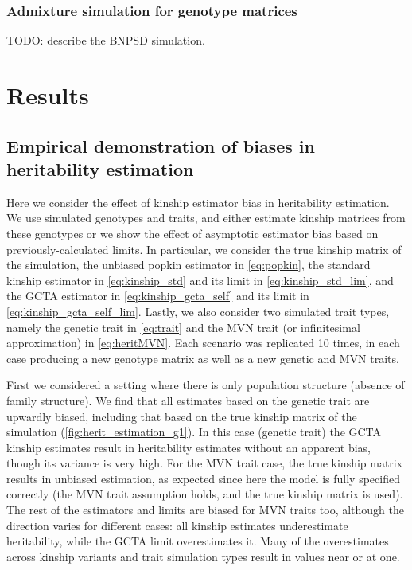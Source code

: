 \documentclass[11pt]{article}
\begin{document}
\subsubsection{Admixture simulation for genotype matrices}

TODO: describe the BNPSD simulation.

\section{Results}

\subsection{Empirical demonstration of biases in heritability estimation}

Here we consider the effect of kinship estimator bias in heritability estimation.
We use simulated genotypes and traits, and either estimate kinship matrices from these genotypes or we show the effect of asymptotic estimator bias based on previously-calculated limits.
In particular, we consider the true kinship matrix of the simulation,
the unbiased popkin estimator in \cref{eq:popkin},
the standard kinship estimator in \cref{eq:kinship_std}
and its limit in \cref{eq:kinship_std_lim},
and the GCTA estimator in \cref{eq:kinship_gcta_self} and its limit in \cref{eq:kinship_gcta_self_lim}.
Lastly, we also consider two simulated trait types, namely the genetic trait in \cref{eq:trait} and the MVN trait (or infinitesimal approximation) in \cref{eq:heritMVN}.
Each scenario was replicated 10 times, in each case producing a new genotype matrix as well as a new genetic and MVN traits.

First we considered a setting where there is only population structure (absence of family structure).
We find that all estimates based on the genetic trait are upwardly biased, including that based on the true kinship matrix of the simulation (\cref{fig:herit_estimation_g1}).
In this case (genetic trait) the GCTA kinship estimates result in heritability estimates without an apparent bias, though its variance is very high.
For the MVN trait case, the true kinship matrix results in unbiased estimation, as expected since here the model is fully specified correctly (the MVN trait assumption holds, and the true kinship matrix is used).
The rest of the estimators and limits are biased for MVN traits too, although the direction varies for different cases:
all kinship estimates underestimate heritability, while the GCTA limit overestimates it.
Many of the overestimates across kinship variants and trait simulation types result in values near or at one.
\end{document}
